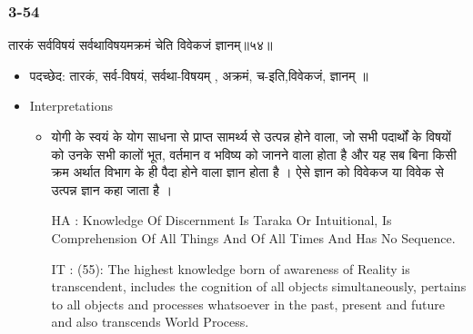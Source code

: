 \begin{frame}[fragile]\frametitle{3-54}
\begin{sanskrit}
तारकं सर्वविषयं सर्वथाविषयमक्रमं चेति विवेकजं ज्ञानम्॥५४॥
\end{sanskrit}

	\begin{itemize}
	\item पदच्छेद:  तारकं, सर्व-विषयं, सर्वथा-विषयम् , अक्रमं, च-इति,विवेकजं, ज्ञानम् ॥
	\item Interpretations
		\begin{itemize}	
		\item योगी के स्वयं के योग साधना से प्राप्त सामर्थ्य से उत्पन्न होने वाला, जो सभी पदार्थों के विषयों को उनके सभी कालों भूत, वर्तमान व भविष्य को जानने वाला होता है और यह सब बिना किसी क्रम अर्थात विभाग के ही पैदा होने वाला ज्ञान होता है । ऐसे ज्ञान को विवेकज या विवेक से उत्पन्न ज्ञान कहा जाता है ।
		\item [HA]: Knowledge Of Discernment Is Taraka Or Intuitional, Is Comprehension Of All Things And Of All Times And Has No Sequence.
		\item [IT]: (55): The highest knowledge born of awareness of Reality is transcendent, includes the cognition of all objects simultaneously, pertains to all objects and processes whatsoever in the past, present and future and also transcends World Process.
		\end{itemize}
	\end{itemize}
\end{frame}

